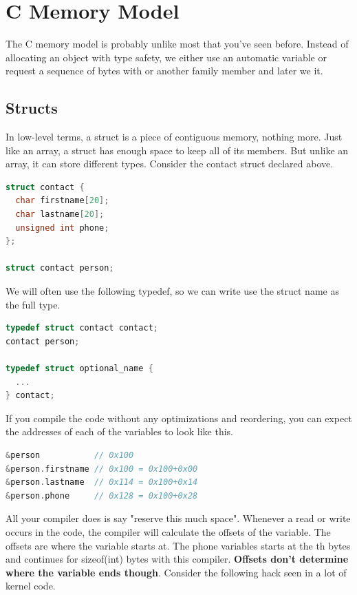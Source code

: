 \section{C Memory Model}

The C memory model is probably unlike most that you've seen before. Instead of allocating an object with type safety, we either use an automatic variable or request a sequence of bytes with  or another family member and later we  it.

\subsection{Structs}

In low-level terms, a struct is a piece of contiguous memory, nothing more.
Just like an array, a struct has enough space to keep all of its members.
But unlike an array, it can store different types. Consider the contact struct declared above.

\begin{lstlisting}[language=C]
struct contact {
  char firstname[20];
  char lastname[20];
  unsigned int phone;
};

struct contact person;
\end{lstlisting}

We will often use the following typedef, so we can write use the struct name as the full type.

\begin{lstlisting}[language=C]
typedef struct contact contact;
contact person;

typedef struct optional_name {
  ...
} contact;
\end{lstlisting}

If you compile the code without any optimizations and reordering, you can expect the addresses of each of the variables to look like this.

\begin{lstlisting}[language=C]
&person           // 0x100
&person.firstname // 0x100 = 0x100+0x00
&person.lastname  // 0x114 = 0x100+0x14
&person.phone     // 0x128 = 0x100+0x28
\end{lstlisting}

All your compiler does is say "reserve this much space".
Whenever a read or write occurs in the code, the compiler will calculate the offsets of the variable.
The offsets are where the variable starts at.
The phone variables starts at the th bytes and continues for sizeof(int) bytes with this compiler.
\textbf{Offsets don't determine where the variable ends though}.
Consider the following hack seen in a lot of kernel code.

